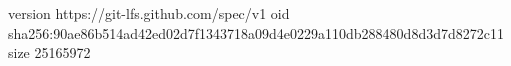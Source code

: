 version https://git-lfs.github.com/spec/v1
oid sha256:90ae86b514ad42ed02d7f1343718a09d4e0229a110db288480d8d3d7d8272c11
size 25165972
